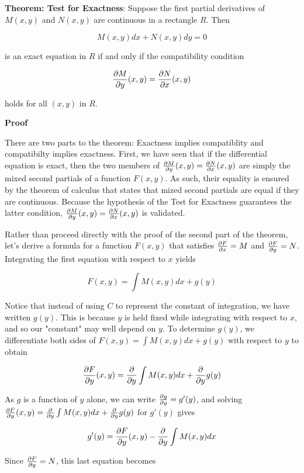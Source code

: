 \nopagenumbers
{\bf Theorem: Test for Exactness}: Suppose the first partial derivatives of $M(x,y)$ and $N(x,y)$ are continuous in a rectangle $R$. Then

$$M(x,y)dx+N(x,y)dy=0$$

is an exact equation in $R$ if and only if the compatibility condition

$${\partial M\over\partial y}(x,y)={\partial N\over\partial x}(x,y)$$

holds for all $(x,y)$ in $R$.

\vskip 10pt
{\bf Proof}

\vskip 6pt
There are two parts to the theorem: Exactness implies compatiblity and compatibilty implies exactness. First, we have seen that if the differential equation is exact, then the two members of ${\partial M\over\partial y}(x,y)={\partial N\over\partial x}(x,y)$ are simply the mixed second partials of a function $F(x,y)$. As such, their equality is ensured by the theorem of calculus that states that mized second partials are equal if they are continuous. Because the hypothesis of the Test for Exactness guarantees the latter condition, ${\partial M\over\partial y}(x,y)={\partial N\over\partial x}(x,y)$ is validated.

\vskip 1mm
Rather than proceed directly with the proof of the second part of the theorem, let's derive a formula for a function $F(x,y)$ that satisfies ${\partial F\over\partial x}=M$ and ${\partial F\over \partial y}=N$. Integrating the first equation with respect to $x$ yields

$$F(x,y)=\int M(x,y)dx+g(y)$$

Notice that instead of using $C$ to represent the constant of integration, we have written $g(y)$. This is because $y$ is held fixed while integrating with respect to $x$, and so our "constant" may well depend on $y$. To determine $g(y)$, we differentiate both sides of $F(x,y)=\int M(x,y)dx+g(y)$ with respect to $y$ to obtain

$${\partial F\over\partial y}(x,y)={\partial\over\partial y}\int M(x,y)dx+{\partial\over\partial y}g(y)$$

As $g$ is a function of $y$ alone, we can write ${\partial g\over\partial y}=g'(y)$, and solving ${\partial F\over\partial y}(x,y)={\partial\over\partial y}\int M(x,y)dx+{\partial\over\partial y}g(y)$ for $g'(y)$  gives

$$g'(y)={\partial F\over\partial y}(x,y)-{\partial\over\partial y}\int M(x,y)dx$$

Since ${\partial F\over\partial y}=N$, this last equation becomes

